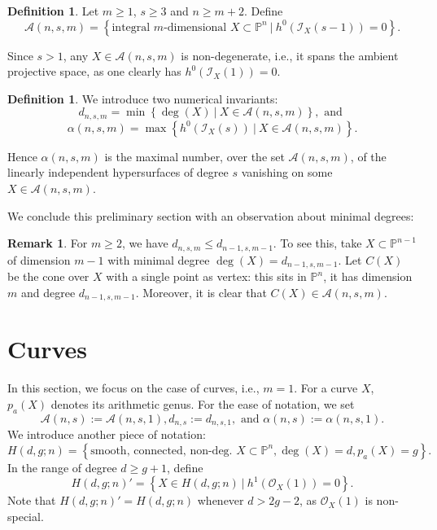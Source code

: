 \documentclass[a4, 11pt]{amsart}
\theoremstyle{plain}
\theoremstyle{definition}
\newtheorem{definition}[theorem]{Definition}
\newtheorem{remark}[theorem]{Remark}
\newcommand{\enm}[1]{\ensuremath{#1}}          %
\newcommand{\cal}[1]{\mathcal{#1}}
\newcommand{\PP}{\enm{\mathbb{P}}}
\newcommand{\Aa}{\enm{\cal{A}}}
\newcommand{\Ii}{\enm{\cal{I}}}
\newcommand{\Oo}{\enm{\cal{O}}}
\begin{document}
\begin{definition}
Let $m \ge 1$, $s\ge 3$ and $n\ge m+2$. Define 
\[
\Aa (n,s,m) = \left\lbrace \mbox{integral $m$-dimensional } X\subset \PP^n \ | \   h^0(\Ii _X(s-1)) =0 \right\rbrace. 
\] 
\end{definition}

Since $s>1$, any $X\in \Aa (n,s,m)$ is non-degenerate, i.e., it spans the ambient projective space, as one clearly has $h^0(\Ii_X(1)) = 0$. 

\begin{definition}
We introduce two numerical invariants: 
\[
d_{n,s,m} = \min \left\lbrace \deg(X) \ | \  X\in \Aa (n,s,m) \right\rbrace, \mbox{ and }
\]  
\[
\alpha (n,s,m) = \max \left\lbrace h^0(\Ii _X(s)) \ | \ X\in \Aa(n,s,m) \right\rbrace. 
\] 

Hence $\alpha(n,s,m)$ is the maximal number, over the set $\Aa(n,s,m)$, of the linearly independent hypersurfaces of degree $s$ vanishing on some $X\in \Aa(n,s,m)$.\end{definition}

We conclude this preliminary section with an observation about minimal degrees: 
\begin{remark}
For $m\ge 2$, we have $d_{n,s,m} \le d_{n-1,s, m-1}$. To see this, take $X\subset \mathbb P^{n-1}$ of dimension $m-1$ with minimal degree $\deg(X)=d_{n-1,s,m-1}$. Let $C(X)$ be the cone over $X$ with a single point as vertex: this sits in $\PP^n$, it has dimension $m$ and degree $d_{n-1,s,m-1}$. Moreover, it is clear that $C(X)\in \Aa(n,s,m)$. 
\end{remark}
\section{Curves}\label{curves}

In this section, we focus on the case of curves, i.e., $m=1$. For a curve $X$, $p_a(X)$ denotes its arithmetic genus. 
For the ease of notation, we set 
\[
\Aa (n,s):= \Aa (n,s,1), d_{n,s}:= d_{n,s,1}, \mbox{ and } \alpha (n,s):= \alpha (n,s,1).
\]
We introduce another piece of notation: 
\[
H(d,g;n) = \left\lbrace \mbox{smooth, connected, non-deg. } X\subset \PP^n, \deg(X) = d, p_a(X) = g\right\rbrace. 
\] 
In the range of degree $d\ge g+1$, define 
\[
H(d,g;n)' = \left\lbrace X\in H(d,g;n)\ | \ h^1(\Oo _X(1)) =0\right\rbrace. 
\]
Note that $H(d,g; n)'=H(d,g; n)$ whenever $d>2g-2$, as $\Oo_X(1)$ is non-special. 
\end{document}
